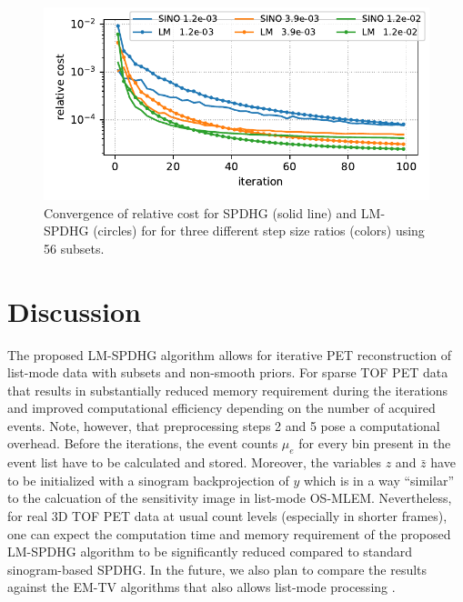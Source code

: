 \documentclass[10pt,twocolumn,twoside,letterpaper]{IEEEtran}
\begin{document}
\begin{figure}[t]
\centerline{\includegraphics[width=0.8\columnwidth]{./figs/brain2d_counts_1.0E+06_beta_2.0E-03_niter_10000_100_nsub_56_precond_False_metrics.pdf}}
\caption{Convergence of relative cost for SPDHG (solid line) and LM-SPDHG (circles) 
for for three different step size ratios (colors) using 56 subsets.}
\label{fig:cost}
\end{figure}


\section{Discussion}

The proposed LM-SPDHG algorithm allows for  iterative PET reconstruction of list-mode
data with subsets and non-smooth priors.
For sparse TOF PET data that results in substantially reduced memory requirement during
the iterations and improved computational efficiency depending on the number of acquired
events.
Note, however, that preprocessing steps 2 and 5 pose a computational overhead. 
Before the iterations, the event counts $\mu_e$ for every bin present in the event list
have to be calculated and stored.
Moreover, the variables $z$ and $\bar{z}$ have to be initialized with a sinogram
backprojection of $y$ which is in a way ``similar'' to the calcuation of the sensitivity
image in list-mode OS-MLEM.
Nevertheless, for real 3D TOF PET data at usual count levels (especially in shorter frames), one can
expect the computation time and memory requirement of the proposed LM-SPDHG algorithm to be significantly reduced compared to standard sinogram-based SPDHG.
In the future, we also plan to compare the results against the EM-TV algorithms that also
allows list-mode processing \cite{Sawatzky2008}.

\end{document}
